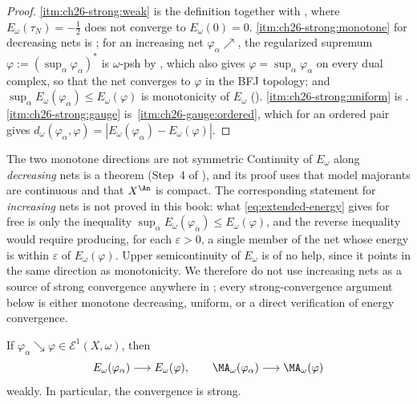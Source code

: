 \begin{proof}
\cref{itm:ch26-strong:weak} is the definition together with
, where \(E_\omega(\tau_N)=-\tfrac12\) does not
converge to \(E_\omega(0)=0\).  \cref{itm:ch26-strong:monotone} for decreasing
nets is ; for an increasing net
\(\varphi_\alpha\nearrow\), the regularized supremum
\(\varphi:=(\sup_\alpha\varphi_\alpha)^*\) is \(\omega\)-psh by
, which also gives
\(\varphi=\sup_\alpha\varphi_\alpha\) on every dual complex, so that the net
converges to \(\varphi\) in the BFJ topology; and
\(\sup_\alpha E_\omega(\varphi_\alpha)\leq E_\omega(\varphi)\) is
monotonicity of \(E_\omega\) ().
\cref{itm:ch26-strong:uniform} is .
\cref{itm:ch26-strong:gauge} is
\,\cref{itm:ch26-gauge:ordered}, which for an
ordered pair gives \(d_\omega(\varphi_\alpha,\varphi)
=|E_\omega(\varphi_\alpha)-E_\omega(\varphi)|\).
\end{proof}

\begin{warning}{The two monotone directions are not symmetric}
Continuity of \(E_\omega\) along \emph{decreasing} nets is a theorem
(Step~4 of ), and its proof uses that model
majorants are continuous and that \(X^{\An}\) is compact.  The corresponding
statement for \emph{increasing} nets is not proved in this book: what
\eqref{eq:extended-energy} gives for free is only the inequality
\(\sup_\alpha E_\omega(\varphi_\alpha)\leq E_\omega(\varphi)\), and the
reverse inequality would require producing, for each \(\varepsilon>0\), a
single member of the net whose energy is within \(\varepsilon\) of
\(E_\omega(\varphi)\).  Upper semicontinuity of \(E_\omega\) is of no help,
since it points in the same direction as monotonicity.  We therefore do not
use increasing nets as a source of strong convergence anywhere in
; every strong-convergence argument below is either monotone
decreasing, uniform, or a direct verification of energy convergence.
\end{warning}

\begin{proposition}\label{prop:e1-monotone-continuity}
If \(\varphi_\alpha\searrow\varphi\in\mathcal E^1(X,\omega)\), then
\[
 E_\omega(\varphi_\alpha)\longrightarrow E_\omega(\varphi),
\qquad
 \MA_\omega(\varphi_\alpha)\longrightarrow\MA_\omega(\varphi)
\]
weakly. In particular, the convergence is strong.
\end{proposition}

